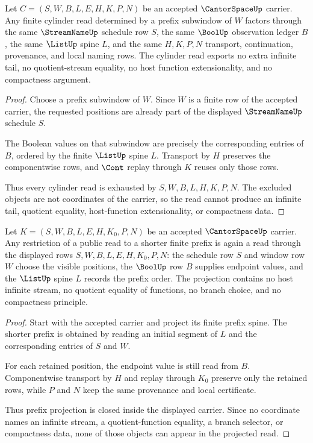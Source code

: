 \begin{theorem}
\label{thm:cantor-space-finite-prefix-cylinder-stability}
Let $C=(S,W,B,L,E,H,K,P,N)$ be an accepted $\CantorSpaceUp$ carrier. Any
finite cylinder read determined by a prefix subwindow of $W$ factors through
the same $\StreamNameUp$ schedule row $S$, the same $\BoolUp$ observation
ledger $B$, the same $\ListUp$ spine $L$, and the same $H,K,P,N$ transport,
continuation, provenance, and local naming rows. The cylinder read exports no
extra infinite tail, no quotient-stream equality, no host function
extensionality, and no compactness argument.
\end{theorem}
\begin{proof}
Choose a prefix subwindow of $W$. Since $W$ is a finite row of the accepted
carrier, the requested positions are already part of the displayed
$\StreamNameUp$ schedule $S$.

The Boolean values on that subwindow are precisely the corresponding entries
of $B$, ordered by the finite $\ListUp$ spine $L$. Transport by $H$ preserves
the componentwise rows, and $\Cont$ replay through $K$ reuses only those rows.

Thus every cylinder read is exhausted by $S,W,B,L,H,K,P,N$. The excluded
objects are not coordinates of the carrier, so the read cannot produce an
infinite tail, quotient equality, host-function extensionality, or compactness
data.
\end{proof}

\begin{theorem}
\label{thm:cantor-space-prefix-projection-stability}
Let $K=(S,W,B,L,E,H,K_0,P,N)$ be an accepted $\CantorSpaceUp$ carrier. Any restriction of a public read to a shorter finite prefix is again a read through the displayed rows $S,W,B,L,E,H,K_0,P,N$: the schedule row $S$ and window row $W$ choose the visible positions, the $\BoolUp$ row $B$ supplies endpoint values, and the $\ListUp$ spine $L$ records the prefix order. The projection contains no host infinite stream, no quotient equality of functions, no branch choice, and no compactness principle.
\end{theorem}
\begin{proof}
Start with the accepted carrier and project its finite prefix spine. The shorter prefix is obtained by reading an initial segment of $L$ and the corresponding entries of $S$ and $W$.

For each retained position, the endpoint value is still read from $B$. Componentwise transport by $H$ and replay through $K_0$ preserve only the retained rows, while $P$ and $N$ keep the same provenance and local certificate.

Thus prefix projection is closed inside the displayed carrier. Since no coordinate names an infinite stream, a quotient-function equality, a branch selector, or compactness data, none of those objects can appear in the projected read.
\end{proof}

